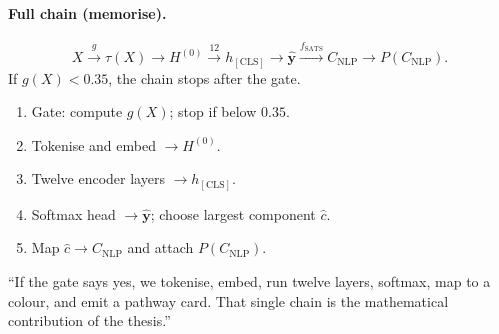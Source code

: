 \paragraph{Full chain (memorise).}
\begin{equation}
  X \xrightarrow{g} \tau(X) \to H^{(0)}
  \xrightarrow{12} h_{\mathrm{[CLS]}}
  \to \hat{\mathbf{y}}
  \xrightarrow{f_{\mathrm{SATS}}} C_{\mathrm{NLP}}
  \to P(C_{\mathrm{NLP}}).
  \label{eq:e2e}
\end{equation}
If \(g(X)<0.35\), the chain stops after the gate.

\begin{enumerate}
  \item Gate: compute \(g(X)\); stop if below \(0.35\).
  \item Tokenise and embed \(\to H^{(0)}\).
  \item Twelve encoder layers \(\to h_{\mathrm{[CLS]}}\).
  \item Softmax head \(\to \hat{\mathbf{y}}\); choose largest component \(\hat{c}\).
  \item Map \(\hat{c}\to C_{\mathrm{NLP}}\) and attach \(P(C_{\mathrm{NLP}})\).
\end{enumerate}

\begin{saybox}
``If the gate says yes, we tokenise, embed, run twelve layers, softmax, map to a colour, and emit a pathway card. That single chain is the mathematical contribution of the thesis.''
\end{saybox}
